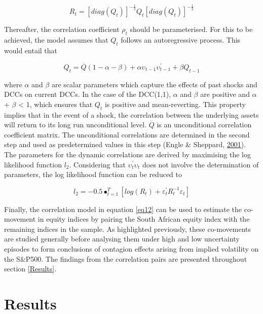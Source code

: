 \documentclass[11pt,preprint, authoryear]{elsarticle}
\numberwithin{equation}{section}
\numberwithin{figure}{section}
\numberwithin{table}{section}
\begin{document}
\begin{equation}
R_{t} = [diag(Q_t)]^{-\frac{1}{2}} Q_t[diag(Q_t)]^{-\frac{1}{2}} 
\label{eq11}
\end{equation}

Thereafter, the correlation coefficient \(\rho_t\) should be
parameterised. For this to be achieved, the model assumes that \(Q_t\)
follows an autoregressive process. This would entail that

\begin{equation}
Q_{t} = \overline{Q} (1 - \alpha - \beta) + \alpha \upsilon_{t-1} \upsilon_{t-1}^{'} + \beta Q_{t-1}
\label{eq12}
\end{equation}

where \(\alpha\) and \(\beta\) are scalar parameters which capture the
effects of past shocks and DCCs on current DCCs. In the case of the
DCC(1,1), \(\alpha\) and \(\beta\) are positive and \(\alpha\) +
\(\beta\) \textless{} 1, which ensures that \(Q_t\) is positive and
mean-reverting. This property implies that in the event of a shock, the
correlation between the underlying assets will return to its long run
unconditional level. \(\overline{Q}\) is an unconditional correlation
coefficient matrix. The unconditional correlations are determined in the
second step and used as predetermined values in this step (Engle \&
Sheppard, \protect\hyperlink{ref-engle2001theoretical}{2001}). The
parameters for the dynamic correlations are derived by maximising the
log likelihood function \(l_2\). Considering that
\(\upsilon_t^{'} \upsilon_t\) does not involve the determination of
parameters, the log likelihood function can be reduced to

\begin{equation}
l_2 = -0.5 \bullet_{t=1}^{T} [log(R_t) + \varepsilon_t^{'} R_t^{-1} \varepsilon_t]
\label{eq13}
\end{equation}

Finally, the correlation model in equation \ref{eq12} can be used to
estimate the co-movement in equity indices by pairing the South African
equity index with the remaining indices in the sample. As highlighted
previously, these co-movements are studied generally before analysing
them under high and low uncertainty episodes to form conclusions of
contagion effects arising from implied volatility on the S\&P500. The
findings from the correlation pairs are presented throughout section
\ref{Results}.

\hypertarget{results}{%
\section{\texorpdfstring{Results
\label{Results}}{Results }}\label{results}}
\end{document}
